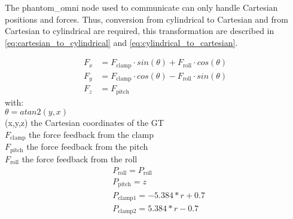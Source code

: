 The phantom\_omni node\cite{phantom_omni_github} used to communicate can only handle Cartesian positions and forces. Thus, conversion from cylindrical to Cartesian and from Cartesian to cylindrical are required, this transformation are described in \eqref{eq:cartesian_to_cylindrical} and \eqref{eq:cylindrical_to_cartesian}.



\begin{equation} 
\begin{split}
	F_x &= F_\textrm{clamp}\cdot sin(\theta) + F_\textrm{roll}\cdot cos(\theta)\\
	F_y &= F_\textrm{clamp}\cdot cos(\theta) - F_\textrm{roll}\cdot sin(\theta)\\
	F_z &= F_\textrm{pitch}
\end{split}
\label{eq:cylindrical_to_cartesian}
\end{equation}
with:\\
\hspace*{8mm} $\theta = atan2(y,x)$\\
\hspace*{8mm} (x,y,z)  the Cartesian coordinates of the GT\\
\hspace*{8mm} $F_\textrm{clamp}$  the force feedback from the clamp\\
\hspace*{8mm} $F_\textrm{pitch}$  the force feedback from the pitch\\
\hspace*{8mm} $F_\textrm{roll}$  the force feedback from the roll\\

\begin{equation} 
\begin{split}
	&P_\textrm{roll} = P_\textrm{roll}\\
	&P_\textrm{pitch} = z\\
	&P_\textrm{clamp1} = -5.384*r + 0.7\\
	&P_\textrm{clamp2} = 5.384*r - 0.7
\end{split}
\label{eq:cartesian_to_cylindrical}
\end{equation}

